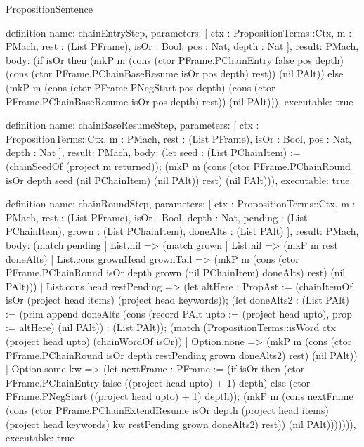 \begin{lexlean}{PropositionSentence}
\begin{semanticmodule}
definition{
  name: chainEntryStep,
  parameters: [
    ctx : PropositionTerms::Ctx,
    m : PMach,
    rest : (List PFrame),
    isOr : Bool,
    pos : Nat,
    depth : Nat
  ],
  result: PMach,
  body: (if isOr then (mkP m (cons (ctor PFrame.PChainEntry false pos depth) (cons (ctor PFrame.PChainBaseResume isOr pos depth) rest)) (nil PAlt)) else (mkP m (cons (ctor PFrame.PNegStart pos depth) (cons (ctor PFrame.PChainBaseResume isOr pos depth) rest)) (nil PAlt))),
  executable: true
}

definition{
  name: chainBaseResumeStep,
  parameters: [
    ctx : PropositionTerms::Ctx,
    m : PMach,
    rest : (List PFrame),
    isOr : Bool,
    pos : Nat,
    depth : Nat
  ],
  result: PMach,
  body: (let seed : (List PChainItem) := (chainSeedOf (project m returned)); (mkP m (cons (ctor PFrame.PChainRound isOr depth seed (nil PChainItem) (nil PAlt)) rest) (nil PAlt))),
  executable: true
}

definition{
  name: chainRoundStep,
  parameters: [
    ctx : PropositionTerms::Ctx,
    m : PMach,
    rest : (List PFrame),
    isOr : Bool,
    depth : Nat,
    pending : (List PChainItem),
    grown : (List PChainItem),
    doneAlts : (List PAlt)
  ],
  result: PMach,
  body: (match pending
    | List.nil => (match grown
        | List.nil => (mkP m rest doneAlts)
        | List.cons grownHead grownTail => (mkP m (cons (ctor PFrame.PChainRound isOr depth grown (nil PChainItem) doneAlts) rest) (nil PAlt)))
    | List.cons head restPending => (let altHere : PropAst := (chainItemOf isOr (project head items) (project head keywords)); (let doneAlts2 : (List PAlt) := (prim append doneAlts (cons (record PAlt {upto := (project head upto), prop := altHere}) (nil PAlt)) : (List PAlt)); (match (PropositionTerms::isWord ctx (project head upto) (chainWordOf isOr))
        | Option.none => (mkP m (cons (ctor PFrame.PChainRound isOr depth restPending grown doneAlts2) rest) (nil PAlt))
        | Option.some kw => (let nextFrame : PFrame := (if isOr then (ctor PFrame.PChainEntry false ((project head upto) + 1) depth) else (ctor PFrame.PNegStart ((project head upto) + 1) depth)); (mkP m (cons nextFrame (cons (ctor PFrame.PChainExtendResume isOr depth (project head items) (project head keywords) kw restPending grown doneAlts2) rest)) (nil PAlt))))))),
  executable: true
}


\end{semanticmodule}
\end{lexlean}
